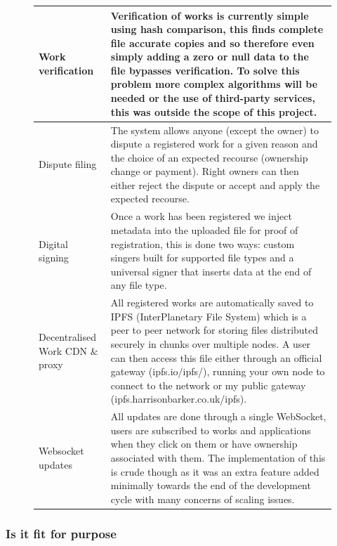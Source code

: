 \begin{figure}[H]
\begin{table}[H]
\begin{tabular}{|p{}|p{}|}
Work verification               & Verification of works is currently simple using hash comparison, this finds complete file accurate copies and so therefore even simply adding a zero or null data to the file bypasses verification. To solve this problem more complex algorithms will be needed or the use of third-party services, this was outside the scope of this project.                                   \\ \hline
Dispute filing                  & The system allows anyone (except the owner) to dispute a registered work for a given reason and the choice of an expected recourse (ownership change or payment). Right owners can then either reject the dispute or accept and apply the expected recourse.                                                                                                                        \\ \hline
Digital signing                 & Once a work has been registered we inject metadata into the uploaded file for proof of registration, this is done two ways: custom singers built for supported file types and a universal signer that inserts data at the end of any file type.                                                                                                                                     \\ \hline
Decentralised Work CDN \& proxy & All registered works are automatically saved to IPFS (InterPlanetary File System) which is a peer to peer network for storing files distributed securely in chunks over multiple nodes. A user can then access this file either through an official gateway (ipfs.io/ipfs/), running your own node to connect to the network or my public gateway (ipfs.harrisonbarker.co.uk/ipfs). \\ \hline
Websocket updates               & All updates are done through a single WebSocket, users are subscribed to works and applications when they click on them or have ownership associated with them.  The implementation of this is crude though as it was an extra feature added minimally towards the end of the development cycle with many concerns of scaling issues.                                               \\ \hline

\end{tabular}
\end{table}
\end{figure}

\subsubsection{Is it fit for purpose}

